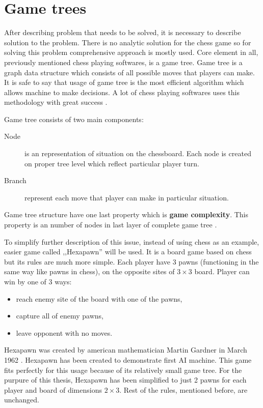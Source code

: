     \section{Game trees}
    After describing problem that needs to be solved, it is necessary to describe solution to the problem. There is no analytic solution for the chess game so for solving this problem comprehensive approach is mostly used. Core element in all, previously mentioned chess playing softwares, is a game tree. Game tree is a graph data structure which consists of all possible moves that players can make. It is safe to say that usage of game tree is the most efficient algorithm which allows machine to make decisions. A lot of chess playing softwares uses this methodology with great success \cite{bib:internet-alphazero,bib:article-competing-paradigms-for-machine-intelligence,bib:article-chessai-in-game-analysis}.

    Game tree consists of two main components:
    \begin{description}
        \item[Node] is an representation of situation on the chessboard. Each node is created on proper tree level which reflect particular player turn.
        \item[Branch] represent each move that player can make in particular situation.
    \end{description}
    Game tree structure have one last property which is \textbf{game complexity}. This property is an number of nodes in last layer of complete game tree \cite{bib:article-impact-of-artificial-intelligence-on-chess-world}.
    
    To simplify further description of this issue, instead of using chess as an example, easier game called ,,Hexapawn'' will be used. It is a board game based on chess but its rules are much more simple. Each player have 3 pawns (functioning in the same way like pawns in chess), on the opposite sites of $3 \times 3$ board. Player can win by one of 3 ways:
    \begin{itemize}
        \item reach enemy site of the board with one of the pawns,
        \item capture all of enemy pawns,
        \item leave opponent with no moves.
    \end{itemize}
    Hexapawn was created by american mathematician Martin Gardner in March 1962 \cite{bib:article-hexapawn}. Hexapawn has been created to demonstrate first AI machine. This game fits perfectly for this usage because of its relatively small game tree. For the purpure of this thesis, Hexapawn has been simplified to just 2 pawns for each player and board of dimensions $2 \times 3$. Rest of the rules, mentioned before, are unchanged.

